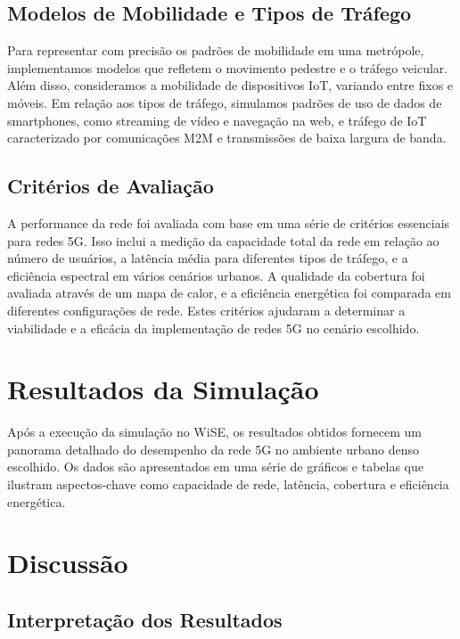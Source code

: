 \documentclass[journal]{IEEEtran}
\begin{document}
\subsection{Modelos de Mobilidade e Tipos de Tráfego}

Para representar com precisão os padrões de mobilidade em uma metrópole, implementamos modelos que refletem o movimento pedestre e o tráfego veicular. Além disso, consideramos a mobilidade de dispositivos IoT, variando entre fixos e móveis. Em relação aos tipos de tráfego, simulamos padrões de uso de dados de smartphones, como streaming de vídeo e navegação na web, e tráfego de IoT caracterizado por comunicações M2M e transmissões de baixa largura de banda.

\subsection{Critérios de Avaliação}

A performance da rede foi avaliada com base em uma série de critérios essenciais para redes 5G. Isso inclui a medição da capacidade total da rede em relação ao número de usuários, a latência média para diferentes tipos de tráfego, e a eficiência espectral em vários cenários urbanos. A qualidade da cobertura foi avaliada através de um mapa de calor, e a eficiência energética foi comparada em diferentes configurações de rede. Estes critérios ajudaram a determinar a viabilidade e a eficácia da implementação de redes 5G no cenário escolhido.

\section{Resultados da Simulação}

Após a execução da simulação no WiSE, os resultados obtidos fornecem um panorama detalhado do desempenho da rede 5G no ambiente urbano denso escolhido. Os dados são apresentados em uma série de gráficos e tabelas que ilustram aspectos-chave como capacidade de rede, latência, cobertura e eficiência energética.

\section{Discussão}

\subsection{Interpretação dos Resultados}
\end{document}
